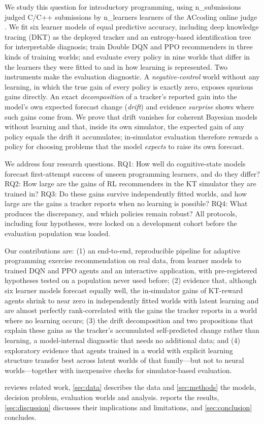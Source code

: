 We study this question for introductory programming, using {{n_submissions}} judged C/C++ submissions by {{n_learners}} learners of the ACcoding online judge \citep{chen2024accoding}. We fit six learner models of equal predictive accuracy, including deep knowledge tracing (DKT) as the deployed tracker and an entropy-based identification tree for interpretable diagnosis; train Double DQN and PPO recommenders in three kinds of training worlds; and evaluate every policy in nine worlds that differ in the learners they were fitted to and in how learning is represented. Two instruments make the evaluation diagnostic. A \emph{negative-control} world without any learning, in which the true gain of every policy is exactly zero, exposes spurious gains directly. An exact \emph{decomposition} of a tracker's reported gain into the model's own expected forecast change (\emph{drift}) and evidence \emph{surprise} shows where such gains come from. We prove that drift vanishes for coherent Bayesian models without learning and that, inside its own simulator, the expected gain of any policy equals the drift it accumulates; in-simulator evaluation therefore rewards a policy for choosing problems that the model \emph{expects} to raise its own forecast.

We address four research questions. RQ1: How well do cognitive-state models forecast first-attempt success of unseen programming learners, and do they differ? RQ2: How large are the gains of RL recommenders in the KT simulator they are trained in? RQ3: Do these gains survive independently fitted worlds, and how large are the gains a tracker reports when no learning is possible? RQ4: What produces the discrepancy, and which policies remain robust? All protocols, including four hypotheses, were locked on a development cohort before the evaluation population was loaded.

Our contributions are: (1) an end-to-end, reproducible pipeline for adaptive programming exercise recommendation on real data, from learner models to trained DQN and PPO agents and an interactive application, with pre-registered hypotheses tested on a population never used before; (2) evidence that, although six learner models forecast equally well, the in-simulator gains of KT-reward agents shrink to near zero in independently fitted worlds with latent learning and are almost perfectly rank-correlated with the gains the tracker reports in a world where no learning occurs; (3) the drift decomposition and two propositions that explain these gains as the tracker's accumulated self-predicted change rather than learning, a model-internal diagnostic that needs no additional data; and (4) exploratory evidence that agents trained in a world with explicit learning structure transfer best across latent worlds of that family---but not to neural worlds---together with inexpensive checks for simulator-based evaluation.

 reviews related work, \cref{sec:data} describes the data and \cref{sec:methods} the models, decision problem, evaluation worlds and analysis.  reports the results, \cref{sec:discussion} discusses their implications and limitations, and \cref{sec:conclusion} concludes.
